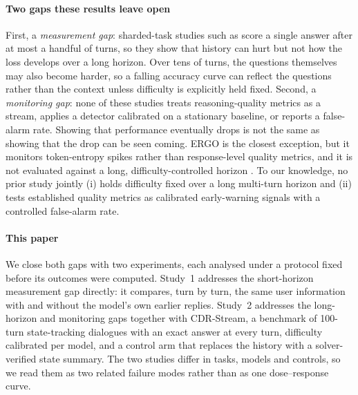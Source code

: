\paragraph{Two gaps these results leave open}
First, a \emph{measurement gap}: sharded-task studies such as \citet{laban2025lost}
score a single answer after at most a handful of turns, so they show that
history can hurt but not how the loss develops over a long horizon. Over tens of turns, the questions themselves
may also become harder, so a falling accuracy curve can reflect the questions
rather than the context unless difficulty is explicitly held fixed. Second, a
\emph{monitoring gap}: none of these studies treats reasoning-quality metrics
as a stream, applies a detector calibrated on a stationary baseline, or reports
a false-alarm rate. Showing that performance eventually drops is not the same
as showing that the drop can be seen coming. ERGO is the closest exception, but
it monitors token-entropy spikes rather than response-level quality metrics,
and it is not evaluated against a long, difficulty-controlled horizon
\citep{khalid2025ergo}. To our knowledge, no prior study jointly (i) holds
difficulty fixed over a long multi-turn horizon and (ii) tests established
quality metrics as calibrated early-warning signals with a controlled
false-alarm rate.

\paragraph{This paper}
We close both gaps with two experiments, each analysed under a protocol fixed
before its outcomes were computed. Study~1 addresses the short-horizon
measurement gap directly: it compares, turn by turn, the same user information
with and without the model's own earlier replies. Study~2 addresses the
long-horizon and monitoring gaps together with CDR-Stream, a benchmark of
100-turn state-tracking dialogues with an exact answer at every turn,
difficulty calibrated per model, and a control arm that replaces the history
with a solver-verified state summary. The two studies differ in tasks, models
and controls, so we read them as two related failure modes rather than as one
dose--response curve.

